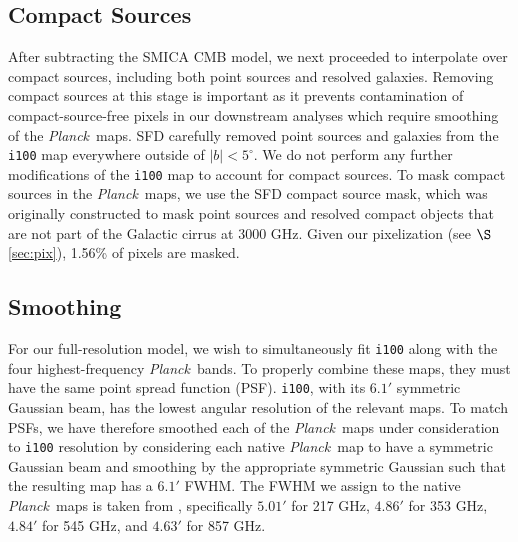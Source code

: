 \documentclass{emulateapj}
\newcommand{\PLANCK}{{\it Planck}}
\begin{document}
\subsection{Compact Sources}
\label{sec:ptsrc}
After subtracting the SMICA CMB model, we next proceeded to interpolate 
over compact sources, including both point sources and resolved galaxies. 
Removing compact sources at this stage is important as it prevents 
contamination of compact-source-free pixels in our downstream analyses which 
require smoothing of the \PLANCK~maps. SFD carefully removed point sources and 
galaxies from the \verb|i100| map everywhere outside of 
$|b|$$<$$5^{\circ}$. We do not perform any further modifications of the 
\verb|i100| map to account for compact sources. To mask compact sources in the 
\PLANCK~maps, we use the SFD compact source mask, which was originally 
constructed to mask point sources and resolved compact objects that are not 
part of the Galactic cirrus at 3000 GHz. Given our pixelization (see 
$\S$\ref{sec:pix}), 1.56\% of pixels are masked. 



\subsection{Smoothing}
\label{sec:smth}
For our full-resolution model, we wish to simultaneously fit \verb|i100| along 
with the four highest-frequency \PLANCK~bands. To properly combine these maps, 
they must have the same point spread function (PSF). \verb|i100|, with its 
$6.1'$ symmetric Gaussian beam, has the lowest angular resolution of the 
relevant maps. To match PSFs, we have therefore smoothed each of the 
\PLANCK~maps under consideration to \verb|i100| resolution by considering each 
native \PLANCK~map to have a symmetric Gaussian beam and smoothing by the 
appropriate symmetric Gaussian such that the resulting map has a  $6.1'$ FWHM. 
The FWHM we assign to the native \PLANCK~maps is taken from \cite{planckbeam}, 
specifically $5.01'$ for 217 GHz, $4.86'$ for 353 GHz, $4.84'$ for 545 GHz, and
 $4.63'$ for 857 GHz.
\end{document}
